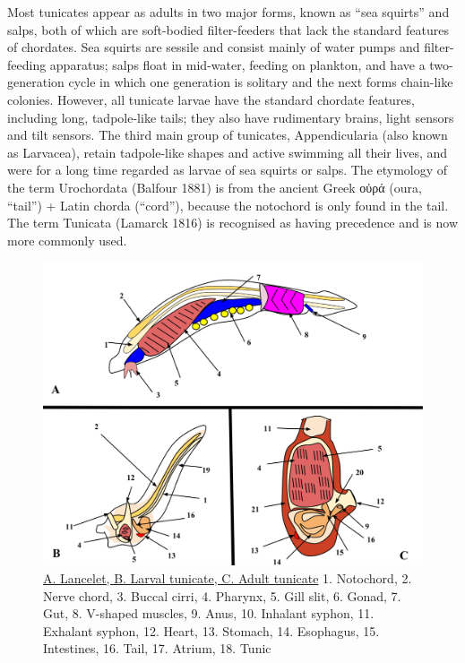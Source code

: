 Most tunicates appear as adults in two major forms, known as ``sea squirts'' and salps, both of which are soft-bodied filter-feeders that lack the standard features of chordates. Sea squirts are sessile and consist mainly of water pumps and filter-feeding apparatus; salps float in mid-water, feeding on plankton, and have a two-generation cycle in which one generation is solitary and the next forms chain-like colonies. However, all tunicate larvae have the standard chordate features, including long, tadpole-like tails; they also have rudimentary brains, light sensors and tilt sensors. The third main group of tunicates, Appendicularia (also known as Larvacea), retain tadpole-like shapes and active swimming all their lives, and were for a long time regarded as larvae of sea squirts or salps. The etymology of the term Urochordata (Balfour 1881) is from the ancient Greek οὐρά (oura, ``tail'') + Latin chorda (``cord''), because the notochord is only found in the tail. The term Tunicata (Lamarck 1816) is recognised as having precedence and is now more commonly used.



\begin{figure}

{\centering \includegraphics[width=0.7\linewidth]{./figures/animals/Comparison_of_Three_Invertebrate_Chordates} 

}

\caption{\href{https://commons.wikimedia.org/wiki/File:Comparison_of_Three_Invertebrate_Chordates.svg}{A. Lancelet, B. Larval tunicate, C. Adult tunicate} 1. Notochord, 2. Nerve chord, 3. Buccal cirri, 4. Pharynx, 5. Gill slit, 6. Gonad, 7. Gut, 8. V-shaped muscles, 9. Anus, 10. Inhalant syphon, 11. Exhalant syphon, 12. Heart, 13. Stomach, 14. Esophagus, 15. Intestines, 16. Tail, 17. Atrium, 18. Tunic}\label{fig:chordatecomparison}
\end{figure}

